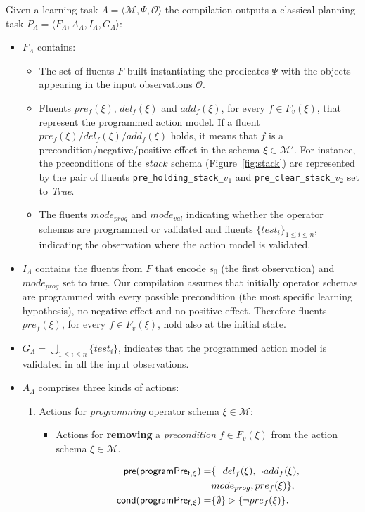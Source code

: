 \documentclass{article}
\newcommand{\tup}[1]{{\langle #1 \rangle}}
\newcommand{\pre}{\mathsf{pre}}     %
\newcommand{\cond}{\mathsf{cond}}   %
\begin{document}
Given a learning task $\Lambda=\tup{\mathcal{M},\Psi,\mathcal{O}}$ the compilation outputs a classical planning task $P_{\Lambda}=\tup{F_{\Lambda},A_{\Lambda},I_{\Lambda},G_{\Lambda}}$:
\begin{itemize}
\item $F_{\Lambda}$ contains:
\begin{itemize}
\item The set of fluents $F$ built instantiating the predicates $\Psi$ with the objects appearing in the input observations $\mathcal{O}$.
\item Fluents $pre_f(\xi)$, $del_f(\xi)$ and $add_f(\xi)$, for every $f\in F_v(\xi)$, that represent the programmed action model. If a fluent $pre_f(\xi)/del_f(\xi)/add_f(\xi)$ holds, it means that $f$ is a precondition/negative/positive effect in the schema $\xi\in \mathcal{M}'$. For instance, the preconditions of the $stack$ schema (Figure~\ref{fig:stack}) are represented by the pair of fluents {\small\tt pre\_holding\_stack\_$v_1$} and {\small\tt pre\_clear\_stack\_$v_2$} set to {\em True}.
\item The fluents $mode_{prog}$ and $mode_{val}$ indicating whether the operator schemas are programmed or validated and fluents $\{test_i\}_{1\leq i\leq n}$, indicating the observation where the action model is validated.
\end{itemize}
\item $I_{\Lambda}$ contains the fluents from $F$ that encode $s_0$ (the first observation) and $mode_{prog}$ set to true. Our compilation assumes that initially operator schemas are programmed with every possible precondition (the most specific learning hypothesis), no negative effect and no positive effect. Therefore fluents $pre_f(\xi)$, for every $f\in F_v(\xi)$, hold also at the initial state.
\item $G_{\Lambda}=\bigcup_{1\leq i\leq n}\{test_i\}$, indicates that the programmed action model is validated in all the input observations.
\item $A_{\Lambda}$ comprises three kinds of actions:
\begin{enumerate}
\item Actions for {\em programming} operator schema $\xi\in\mathcal{M}$:
\begin{itemize}
\item Actions for {\bf removing} a {\em precondition} $f\in F_v(\xi)$ from the action schema $\xi\in\mathcal{M}$.

\begin{small}
\begin{align*}
\hspace*{7pt}\pre(\mathsf{programPre_{f,\xi}})=&\{\neg del_{f}(\xi),\neg add_{f}(\xi),\\
& mode_{prog}, pre_{f}(\xi)\},\\
\cond(\mathsf{programPre_{f,\xi}})=&\{\emptyset\}\rhd\{\neg pre_{f}(\xi)\}.
\end{align*}
\end{small}


\end{itemize}
\end{enumerate}
\end{itemize}
\end{document}
